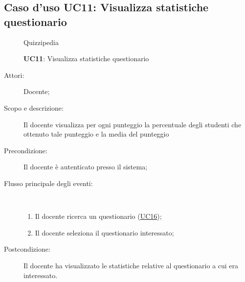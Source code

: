 \subsection{Caso d'uso UC11: Visualizza statistiche questionario}
	\begin{figure}[H]
		\centering
		\begin{resizedtikzpicture}{\textwidth}
		\begin{umlsystem}[x=0, fill=lightgray!20]{Quizzipedia}
		\end{umlsystem}
		\end{resizedtikzpicture}
		\caption{\textbf{UC11}: Visualizza statistiche questionario}
		\label{UC11}
	\end{figure}
\begin{description}
\item[Attori:] Docente;
\item[Scopo e descrizione:] Il docente visualizza per ogni punteggio la percentuale degli studenti che ottenuto tale punteggio e la media del punteggio
      \item[Precondizione:] Il docente è autenticato presso il sistema;

        \item[Flusso principale degli eventi:] \ 
 \begin{enumerate}
          \item Il docente ricerca un questionario (\hyperlink{UC16}{UC16});
          \item Il docente seleziona il questionario interessato;

      \end{enumerate}
    \item[Postcondizione:] Il docente ha visualizzato le statistiche relative al questionario a cui era interessato.
  \end{description}
\hypertarget{UC12}{}
